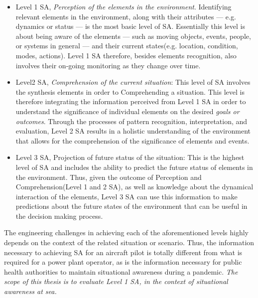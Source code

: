\begin{itemize}
	\item Level 1 SA, \emph{Perception of the elements in the environment}. Identifying relevant elements in the environment, along with their attributes --- e.g. dynamics or status --- is the most basic level of SA. Essentially this level is about being aware of the elements --- such as moving objects, events, people, or systems in general --- and their current states(e.g. location, condition, modes, actions). Level 1 SA therefore, besides elements recognition, also involves their on-going monitoring as they change over time. 
	\item Level2 SA, \emph{Comprehension of the current situation}: This level of SA involves the synthesis elements in order to Comprehending a situation. This level is therefore integrating the information perceived from Level 1 SA in order to understand the significance of individual elements on the desired \emph{goals or outcomes}. Through the processes of pattern recognition, interpretation, and evaluation, Level 2 SA results in a holistic understanding of the environment that allows for the comprehension of the significance of elements and events.
	\item Level 3 SA, Projection of future status of the situation: This is the highest level of SA and includes the ability to predict  the future status of elements in the environment. Thus, given the outcome of Perception and Comprehension(Level 1 and 2 SA), as well as knowledge about the dynamical interaction of the elements, Level 3 SA can use this information  to make predictions about the future states of the environment that can be useful in the decision making process.
\end{itemize}


The engineering challenges in achieving each of the aforementioned levels highly depends on the context of the related situation or scenario. Thus, the information necessary to achieving SA for an aircraft pilot is totally different from what is required for a power plant operator, as is the information necessary for public health authorities to maintain situational awareness during a pandemic. \emph{The scope of this thesis is to evaluate Level 1 SA, in the context of situational awareness at sea.}

